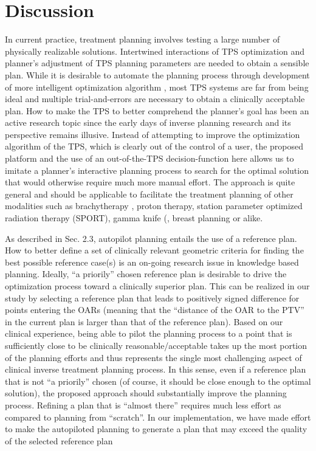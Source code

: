 \section{Discussion}
In current practice, treatment planning involves testing a large number of physically realizable solutions. Intertwined interactions of TPS optimization and planner's adjustment of TPS planning parameters are needed to obtain a sensible plan. While it is desirable to automate the planning process through development of more intelligent optimization algorithm \cite{xing1999a, xing1999b, lee2013, lian2013, yu2000, hoover2015, breedveld2012}, most TPS systems are far from being ideal and multiple trial-and-errors are necessary to obtain a clinically acceptable plan.  How to make the TPS to better comprehend the planner's goal has been an active research topic since the early days of inverse planning research \cite{xing1999a, xing1999b, pugachev2002, yang2004, li2000, zhang2014, fiege2011, zhu2009, li2008, schlaefer2013, tol2015} and its perspective remains illusive. Instead of attempting to improve the optimization algorithm of the TPS, which is clearly out of the control of a user, the proposed platform and the use of an out-of-the-TPS decision-function here allows us to imitate a planner's interactive planning process to search for the optimal solution that would otherwise require much more manual effort. The approach is quite general and should be applicable to facilitate the treatment planning of other modalities such as brachytherapy \cite{cunha2010}, proton therapy\cite{liu2012, giantsoudi2013}, station parameter optimized radiation therapy (SPORT)\cite{li2013, hoover2015}, gamma knife (\cite{zhang2003}, breast planning \cite{purdie2011} or alike. 

As described in Sec. 2.3, autopilot planning entails the use of a reference plan. How to better define a set of clinically relevant geometric criteria for finding the best possible reference case(s) is an on-going research issue in knowledge based planning. Ideally, ``a priorily'' chosen reference plan is desirable to drive the optimization process toward a clinically superior plan. This can be realized in our study by selecting a reference plan that leads to positively signed difference for points entering the OARs (meaning that the ``distance of the OAR to the PTV'' in the current plan is larger than that of the reference plan). Based on our clinical experience, being able to pilot the planning process to a point that is sufficiently close to be clinically reasonable/acceptable takes up the most portion of the planning efforts and thus represents the single most challenging aspect of clinical inverse treatment planning process. In this sense, even if a reference plan that is not ``a priorily'' chosen (of course, it should be close enough to the optimal solution), the proposed approach should substantially improve the planning process. Refining a plan that is ``almost there'' requires much less effort as compared to planning from ``scratch''. In our implementation, we have made effort to make the autopiloted planning to generate a plan that may exceed the quality of the selected reference plan 

